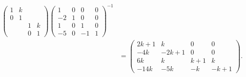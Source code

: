 \documentclass[../../main.tex]{subfiles}
\begin{document}
\begin{solution}
\begin{align*}
\begin{pmatrix}
1 & k & & \\
0 & 1 & & \\
    & & 1 & k \\
    & & 0 & 1
\end{pmatrix}
\begin{pmatrix}
1 & 0 & 0 & 0 \\
-2 & 1 & 0 & 0 \\
1 & 0 & 1 & 0 \\
-5 & 0 & -1 & 1
\end{pmatrix}^{-1} \\
&=
\begin{pmatrix}
2k + 1 & k & 0 & 0 \\
-4k & -2k + 1 & 0 & 0 \\
6k & k & k + 1 & k \\
-14k & -5k & -k & -k + 1
\end{pmatrix}.
\end{align*}
\end{solution}
\end{document}

